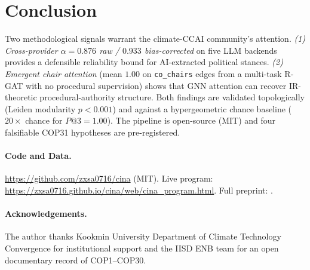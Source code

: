\documentclass{article}
\begin{document}
\section{Conclusion}
\label{sec:conclusion}

Two methodological signals warrant the climate-CCAI community's attention. \emph{(1) Cross-provider $\alpha = 0.876$ raw / $0.933$ bias-corrected} on five LLM backends provides a defensible reliability bound for AI-extracted political stances. \emph{(2) Emergent chair attention} (mean $1.00$ on \texttt{co\_chairs} edges from a multi-task R-GAT with no procedural supervision) shows that GNN attention can recover IR-theoretic procedural-authority structure. Both findings are validated topologically (Leiden modularity $p < 0.001$) and against a hypergeometric chance baseline ($20\times$ chance for $P@3 = 1.00$). The pipeline is open-source (MIT) and four falsifiable COP31 hypotheses are pre-registered.

\paragraph{Code and Data.} \url{https://github.com/zxsa0716/cina} (MIT). Live program: \url{https://zxsa0716.github.io/cina/web/cina_program.html}. Full preprint: \citep{cina2026arxiv}.

\paragraph{Acknowledgements.} The author thanks Kookmin University Department of Climate Technology Convergence for institutional support and the IISD ENB team for an open documentary record of COP1--COP30.
\end{document}
